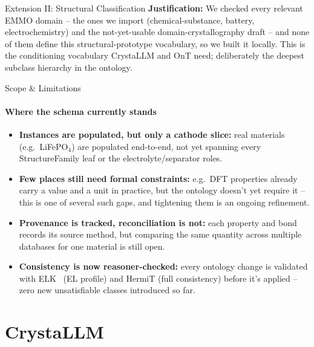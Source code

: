 \documentclass[aspectratio=169, 11pt]{beamer}
\begin{document}
\begin{frame}{Extension II: Structural Classification}
\vspace{0.1cm}
{\scriptsize \textbf{Justification:} We checked every relevant EMMO domain -- the ones we import (chemical-substance, battery, electrochemistry) and the not-yet-usable domain-crystallography draft -- and none of them define this structural-prototype vocabulary, so we built it locally. This is the conditioning vocabulary CrystaLLM and OnT need; deliberately the deepest subclass hierarchy in the ontology.}
\end{frame}

\begin{frame}{Scope \& Limitations}
\framesubtitle{Where the schema currently stands}
\footnotesize
\begin{itemize}\itemsep0.5em
    \item \textbf{Instances are populated, but only a cathode slice:} real materials (e.g.\ LiFePO$_4$) are populated end-to-end, not yet spanning every StructureFamily leaf or the electrolyte/separator roles.
    \item \textbf{Few places still need formal constraints:} e.g.\ DFT properties already carry a value and a unit in practice, but the ontology doesn't yet require it -- this is one of several such gaps, and tightening them is an ongoing refinement.
    \item \textbf{Provenance is tracked, reconciliation is not:} each property and bond records its source method, but comparing the same quantity across multiple databases for one material is still open.
    \item \textbf{Consistency is now reasoner-checked:} every ontology change is validated with ELK~\cite{kazakov2014elk} (EL profile) and HermiT (full consistency) before it's applied -- zero new unsatisfiable classes introduced so far.
\end{itemize}
\end{frame}

\section{CrystaLLM}
\end{document}
